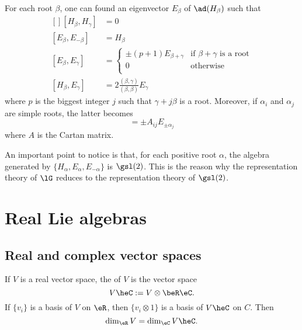 \begin{theorem}
    For each root $\beta$, one can found an eigenvector $E_{\beta}$ of $\ad(H_{\beta})$ such that
    \begin{equation}            \label{EqChevalleyBasis}
        \begin{aligned}[]
            [H_{\beta},H_{\gamma}]      &=  0\\
            [E_{\beta},E_{-\beta}]      &=  H_{\beta}\\
            [E_{\beta},E_{\gamma}]      &=
                                \begin{cases}
                                    \pm(p+1)E_{\beta+\gamma}    &\text{if $\beta+\gamma$ is a root}\\
                                    0               &\text{otherwise}\\
                                \end{cases}\\
            [H_{\beta},E_{\gamma}]      &=2\frac{ (\beta,\gamma) }{ (\beta,\beta) }E_{\gamma}
        \end{aligned}
    \end{equation}
    where $p$ is the biggest integer $j$ such that $\gamma+j\beta$ is a root. Moreover, if $\alpha_i$ and $\alpha_j$ are simple roots, the latter becomes
    \begin{equation}
        [H_{\alpha_i},E_{\pm\alpha_j}]=\pm A_{ij}E_{\pm\alpha_j}
    \end{equation}
    where $A$ is the Cartan matrix.
\end{theorem}

An important point to notice is that, for each positive root $\alpha$, the algebra generated by $\{ H_{\alpha},E_{\alpha},E_{-\alpha} \}$ is $\gsl(2)$. This is the reason why the representation theory of $\lG$ reduces to the representation theory of $\gsl(2)$.

\section{Real Lie algebras}

\subsection{Real and complex vector spaces}

If $V$ is a real vector space, the  of $V$ is the vector space
\[
  V\heC:=V\otimes\beR\eC.
\]
If $\{v_i\}$ is a basis of $V$ on $\eR$, then $\{v_i\otimes 1\}$ is a basis of $V\heC$ on $C$. Then
\[
   \dim_{\eR}V=\dim_{\eC}V\heC.
\]


